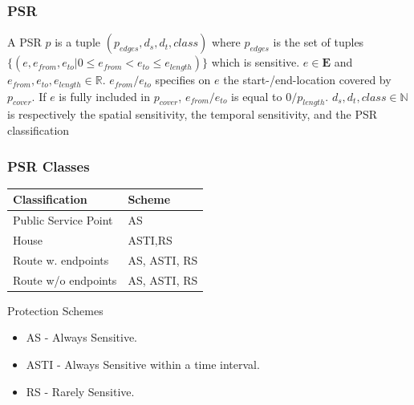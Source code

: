 \begin{frame}[red] %
\frametitle{PSR}

\begin{definition}[PSR]
A PSR $p$ is a tuple $(p_{edges}, d_s, d_t, class)$ where $p_{edges}$ is the set of tuples $\{(e, e_{from}, e_{to} | 0 \leq e_{from} < e_{to} \leq e_{length})\}$ which is sensitive. 
$e \in \mathbf{E}$ and $e_{from}, e_{to}, e_{length} \in \mathbb{R}$. 
$e_{from}/e_{to}$ specifies on $e$ the start-/end-location covered by $p_{cover}$. If $e$ is fully included in $p_{cover}$, $e_{from}/e_{to}$ is equal to $0/p_{length}$.
$d_s, d_t, class \in \mathbb{N}$ is respectively the spatial sensitivity, the temporal sensitivity, and the PSR classification
\end{definition}

\end{frame}

\begin{frame}[red] %
\frametitle{PSR Classes}

\begin{table}
\begin{tabular}{|l|l|}
\hline
\bf Classification	& \bf Scheme \\\hline		
Public Service Point	& AS \\\hline
House			& ASTI,RS \\\hline
Route w. endpoints	& AS, ASTI, RS  \\\hline
Route w/o endpoints	& AS, ASTI, RS  \\\hline
\end{tabular}
\end{table}
\vspace{1em}

Protection Schemes
\begin{itemize}
	\item AS - Always Sensitive.
	\item ASTI - Always Sensitive within a time interval.
	\item RS - Rarely Sensitive.
\end{itemize}
\end{frame}


